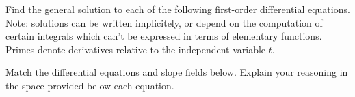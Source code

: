 \documentclass[11pt]{exam}
\begin{document}
%
%
%

\begin{questions}


\addpoints
\question Find the general solution to each of the following first-order differential equations. Note: solutions can be written implicitely, or depend on the computation of certain integrals which can't be expressed in terms of elementary functions. Primes denote derivatives relative to the independent variable $t$. 

\newpage 

\addpoints 
\question Match the differential equations and slope fields below. Explain your reasoning in the space provided below each equation.   


\end{questions}
\end{document}
